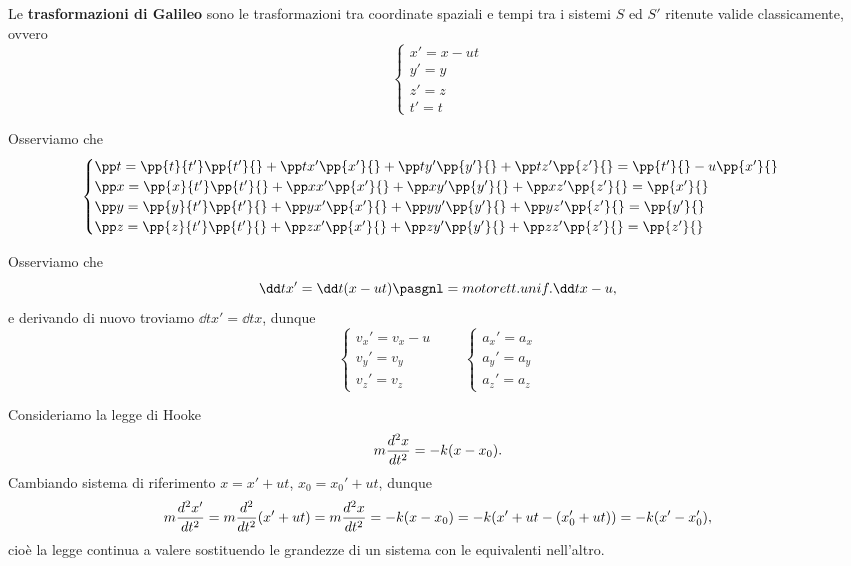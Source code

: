 \begin{definition}
Le \textbf{trasformazioni di Galileo} sono le trasformazioni tra coordinate spaziali e tempi tra i sistemi $S$ ed $S'$ ritenute valide classicamente, ovvero
\[\begin{cases}
x'=x-ut\\
y'=y\\
z'=z\\
t'=t
\end{cases}\]
\end{definition}
\noindent Osserviamo che
\[\begin{cases}
\pp t{}=\pp {t}{t'}\pp{t'}{}+\pp t{x'}\pp {x'}{}+\pp t{y'}\pp {y'}{}+\pp t{z'}\pp {z'}{}=\pp{t'}{}-u\pp{x'}{}\\
\pp x{}=\pp {x}{t'}\pp{t'}{}+\pp x{x'}\pp {x'}{}+\pp x{y'}\pp {y'}{}+\pp x{z'}\pp {z'}{}=\pp {x'}{}\\
\pp y{}=\pp {y}{t'}\pp{t'}{}+\pp y{x'}\pp {x'}{}+\pp y{y'}\pp {y'}{}+\pp y{z'}\pp {z'}{}=\pp {y'}{}\\
\pp z{}=\pp {z}{t'}\pp{t'}{}+\pp z{x'}\pp {x'}{}+\pp z{y'}\pp {y'}{}+\pp z{z'}\pp {z'}{}=\pp {z'}{}
\end{cases}\]
\begin{remark}
Osserviamo che
\[\dd t{x'}=\dd t{}(x-ut)\pasgnl={moto rett. unif.}\dd tx-u,\]
e derivando di nuovo troviamo $\dd t{x'}=\dd t{x}$, dunque
\[\begin{cases}
v_x'=v_x-u\\
v_y'=v_y\\
v_z'=v_z
\end{cases}\qquad \begin{cases}
a_x'=a_x\\
a_y'=a_y\\
a_z'=a_z
\end{cases}\]
\end{remark}



\begin{example}
Consideriamo la legge di Hooke
\[m\dds[2] tx=-k(x-x_0).\]
Cambiando sistema di riferimento $x=x'+ut$, $x_0=x_0'+ut$, dunque
\[m\dds[2]t{x'}=m\dds[2] t{}(x'+ut)=m\dds[2] tx=-k(x-x_0)=-k(x'+ut-(x_0'+ut))=-k(x'-x_0'),\]
cio\`e la legge continua a valere sostituendo le grandezze di un sistema con le equivalenti nell'altro.
\end{example}



